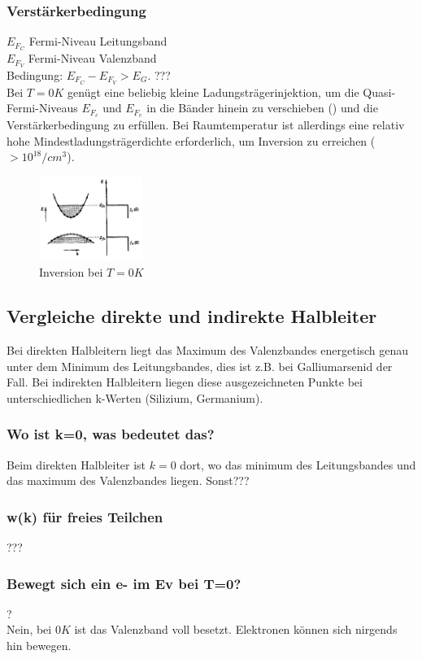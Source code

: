     \subsubsection{Verst\"arkerbedingung}
    $E_{F_C}$ Fermi-Niveau Leitungsband\\
    $E_{F_V}$ Fermi-Niveau Valenzband\\
    Bedingung: $E_{F_C} - E_{F_V} > E_G$. ???\\
    Bei $T=0K$ genügt eine beliebig kleine Ladungsträgerinjektion, um die Quasi-Fermi-Niveaus $E_{F_c}$ und $E_{F_v}$ in die Bänder hinein zu verschieben () und die Verstärkerbedingung zu erfüllen. Bei Raumtemperatur ist allerdings eine relativ hohe Mindestladungsträgerdichte erforderlich, um Inversion zu erreichen ($ > 10^{18}/cm^3$).
        \begin{figure}[H]
            \centering
            \includegraphics[width=0.3\textwidth]{fig/inversionLaser}
            \caption{Inversion bei $T=0K$}
            \label{fig:invLaser}
        \end{figure}

\subsection{Vergleiche direkte und indirekte Halbleiter }\label{k4:inUndIndirekt}
    Bei direkten Halbleitern liegt das Maximum des Valenzbandes energetisch genau unter dem Minimum des Leitungsbandes, dies ist z.B. bei
    Galliumarsenid der Fall. Bei indirekten Halbleitern liegen diese ausgezeichneten Punkte bei unterschiedlichen k-Werten (Silizium, Germanium).
    \subsubsection{Wo ist k=0, was bedeutet das?}
    Beim direkten Halbleiter ist $k=0$ dort, wo das minimum des Leitungsbandes und das maximum des Valenzbandes liegen. Sonst???
    \subsubsection{w(k) für freies Teilchen}
    ???
    \subsubsection{Bewegt sich ein e- im Ev bei T=0?}
    ?\\
    Nein, bei $0K$ ist das Valenzband voll besetzt. Elektronen k\"onnen sich nirgends hin bewegen.
